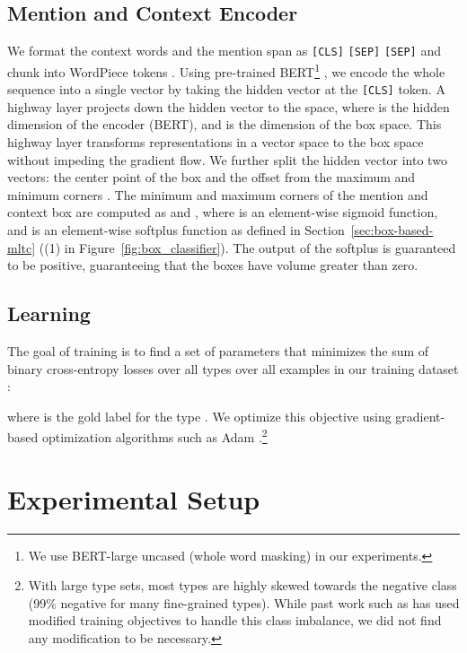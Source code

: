 \documentclass[11pt,a4paper]{article}
\begin{document}
\subsection{Mention and Context Encoder}
\label{sec:encoder}

We format the context words  and the mention span  as  {\tt[CLS]}   {\tt[SEP]}  {\tt[SEP]} and chunk into WordPiece tokens \citep{Yonghui_Wu_16}. Using pre-trained BERT\footnote{We use BERT-large uncased (whole word masking) in our experiments.} \citep{Jacob_Devlin_19}, we encode the whole sequence into a single vector by taking the hidden vector at the {\tt [CLS]} token. A highway layer \citep{Rupesh_Kumar_Srivastava_15} projects down the hidden vector  to the  space, where  is the hidden dimension of the encoder (BERT), and  is the dimension of the box space. This highway layer transforms representations in a vector space to the box space without impeding the gradient flow. We further split the hidden vector  into two vectors: the center point of the box  and the offset from the maximum and minimum corners . The minimum and maximum corners of the mention and context box are computed as  and , where  is an element-wise sigmoid function, and  is an element-wise softplus function as defined in Section~\ref{sec:box-based-mltc} ((1) in Figure~\ref{fig:box_classifier}). The output of the softplus is guaranteed to be positive, guaranteeing that the boxes have volume greater than zero.


\subsection{Learning} 
\label{sec:learning}

The goal of training is to find a set of parameters  that minimizes the sum of binary cross-entropy losses over all types over all examples in our training dataset :

where  is the gold label for the type . We optimize this objective using gradient-based optimization algorithms such as Adam \cite{Kingma_14}.\footnote{With large type sets, most types are highly skewed towards the negative class (99\% negative for many fine-grained types). While past work such as \citet{Eunsol_Choi_18} has used modified training objectives to handle this class imbalance, we did not find any modification to be necessary.}


\section{Experimental Setup}\label{sec:experiments}
\end{document}
